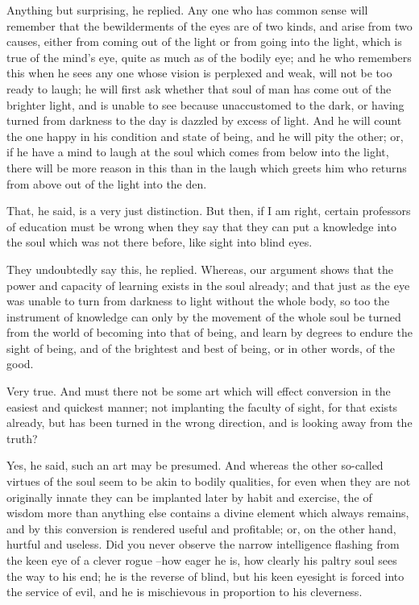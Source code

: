 Anything but surprising, he replied.
Any one who has common sense will remember that the bewilderments of the eyes are of two kinds, and arise from two causes, either from coming out of the light or from going into the light, which is true of the mind's eye, quite as much as of the bodily eye; and he who remembers this when he sees any one whose vision is perplexed and weak, will not be too ready to laugh; he will first ask whether that soul of man has come out of the brighter light, and is unable to see because unaccustomed to the dark, or having turned from darkness to the day is dazzled by excess of light. And he will count the one happy in his condition and state of being, and he will pity the other; or, if he have a mind to laugh at the soul which comes from below into the light, there will be more reason in this than in the laugh which greets him who returns from above out of the light into the den.

That, he said, is a very just distinction.
But then, if I am right, certain professors of education must be wrong when they say that they can put a knowledge into the soul which was not there before, like sight into blind eyes.

They undoubtedly say this, he replied.
Whereas, our argument shows that the power and capacity of learning exists in the soul already; and that just as the eye was unable to turn from darkness to light without the whole body, so too the instrument of knowledge can only by the movement of the whole soul be turned from the world of becoming into that of being, and learn by degrees to endure the sight of being, and of the brightest and best of being, or in other words, of the good.

Very true.
And must there not be some art which will effect conversion in the easiest and quickest manner; not implanting the faculty of sight, for that exists already, but has been turned in the wrong direction, and is looking away from the truth?

Yes, he said, such an art may be presumed.
And whereas the other so-called virtues of the soul seem to be akin to bodily qualities, for even when they are not originally innate they can be implanted later by habit and exercise, the of wisdom more than anything else contains a divine element which always remains, and by this conversion is rendered useful and profitable; or, on the other hand, hurtful and useless. Did you never observe the narrow intelligence flashing from the keen eye of a clever rogue --how eager he is, how clearly his paltry soul sees the way to his end; he is the reverse of blind, but his keen eyesight is forced into the service of evil, and he is mischievous in proportion to his cleverness.

